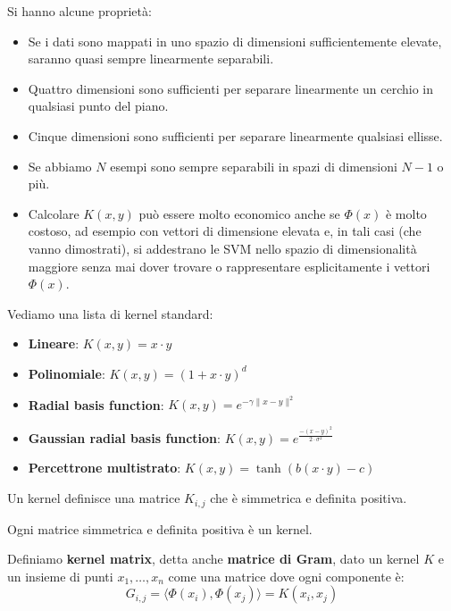 Si hanno alcune proprietà:
\begin{itemize}
    \item Se i dati sono mappati in uno spazio di dimensioni sufficientemente
          elevate, saranno quasi sempre linearmente separabili.
    \item Quattro dimensioni sono sufficienti per separare linearmente un cerchio
          in qualsiasi punto del piano.
    \item Cinque dimensioni sono sufficienti per separare linearmente qualsiasi
          ellisse.
    \item Se abbiamo $N$ esempi sono sempre separabili in spazi di dimensioni
          $N - 1$ o più.
    \item Calcolare $K(x, y)$ può essere molto economico anche se $\Phi(x)$ è
          molto costoso, ad esempio con vettori di dimensione elevata e, in tali
          casi (che vanno dimostrati), si addestrano le SVM nello spazio di
          dimensionalità maggiore senza mai dover trovare o rappresentare
          esplicitamente i vettori $\Phi(x)$.
\end{itemize}
Vediamo una lista di kernel standard:
\begin{itemize}
    \item \textbf{Lineare}: $K(x, y) = x \cdot y$
    \item \textbf{Polinomiale}: $K(x, y) = (1 + x \cdot y)^d$
    \item \textbf{Radial basis function}: $K(x, y) = e^{-\gamma \| x - y\|^2}$
    \item \textbf{Gaussian radial basis function}: $K(x, y) = e^{\frac{-(x-y)^2}
                      {2 \cdot \sigma^2}}$
    \item \textbf{Percettrone multistrato}: $K(x, y) = \tanh(b(x \cdot y) - c)$
\end{itemize}
\begin{teorema}
    Un kernel definisce una matrice $K_{i,j}$ che è simmetrica e definita positiva.
\end{teorema}
\begin{teorema}
    Ogni matrice simmetrica e definita positiva è un kernel.
\end{teorema}
\begin{definizione}
    Definiamo \textbf{kernel matrix}, detta anche \textbf{matrice di Gram},
    dato un kernel $K$ e un insieme di punti $x_1, \dots, x_n$ come una matrice
    dove ogni componente è:
    \begin{equation}
        G_{i, j} = \langle \Phi(x_i), \Phi(x_j) \rangle = K(x_i, x_j)
    \end{equation}
\end{definizione}
